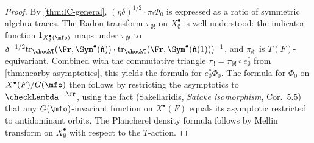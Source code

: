 \begin{proof}
  By \cref{thm:IC-general}, \( (\eta\delta)^{1/2} \cdot \pi_!\Phi_0 \) is expressed as a ratio
  of symmetric algebra traces. The Radon transform \( \pi_{\emptyset!} \) on
  \( X_\emptyset^\bullet \) is well understood: the indicator function
  \( 1_{X_\emptyset^\bullet(\mfo)} \) maps under \( \pi_{\emptyset!} \) to
  \( \delta^{-1/2} \mathrm{tr}_{\checkT}(\Fr, \Sym^\bullet(\check{\mathfrak{n}}))
  \cdot \mathrm{tr}_{\checkT}(\Fr, \Sym^\bullet(\check{\mathfrak{n}}(1)))^{-1} \),
  and \( \pi_{\emptyset!} \) is \( T(F) \)-equivariant.
  Combined with the commutative triangle
  \( \pi_! = \pi_{\emptyset!} \circ e_\emptyset^* \) from \cref{thm:nearby-asymptotics},
  this yields the formula for \( e_\emptyset^*\Phi_0 \).
  The formula for \( \Phi_0 \) on \( X^\bullet(F)/G(\mfo) \) then follows by
  restricting the asymptotics to \( \checkLambda^{-,\Fr} \), using the fact
  (Sakellaridis, \textit{Satake isomorphism}, Cor.~5.5) that any \( G(\mfo) \)-invariant
  function on \( X^\bullet(F) \) equals its asymptotic restricted to antidominant orbits.
  The Plancherel density formula follows by Mellin transform on \( X_\emptyset^\bullet \)
  with respect to the \( T \)-action.
\end{proof}

